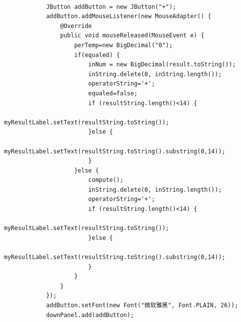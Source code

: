 \documentclass{ctexart}
\begin{document}
\begin{lstlisting}[caption=冗杂的代码]
            
            JButton addButton = new JButton("+");
            addButton.addMouseListener(new MouseAdapter() {
                @Override
                public void mouseReleased(MouseEvent e) {
                    perTemp=new BigDecimal("0");
                    if(equaled) {
                        inNum = new BigDecimal(result.toString());
                        inString.delete(0, inString.length());
                        operatorString='+';
                        equaled=false;
                        if (resultString.length()<14) {
                            myResultLabel.setText(resultString.toString());
                        }else {
                            myResultLabel.setText(resultString.toString().substring(0,14));
                        }
                    }else {
                        compute();
                        inString.delete(0, inString.length());
                        operatorString='+';
                        if (resultString.length()<14) {
                            myResultLabel.setText(resultString.toString());
                        }else {
                            myResultLabel.setText(resultString.toString().substring(0,14));
                        }
                    }
                }
            });
            addButton.setFont(new Font("微软雅黑", Font.PLAIN, 26));
            downPanel.add(addButton);
            

\end{lstlisting}
\end{document}
